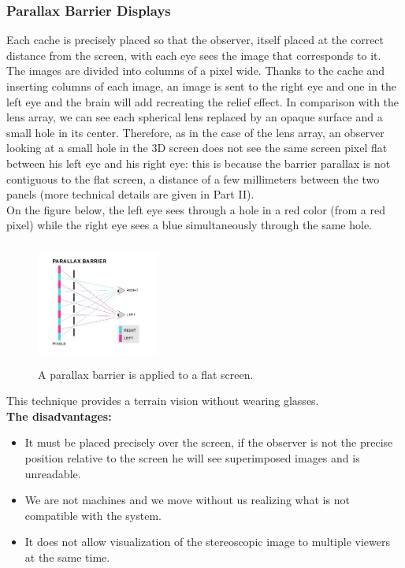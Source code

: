 \subsubsection{Parallax Barrier Displays}

Each cache is precisely placed so that the observer, itself placed at the correct distance from the screen, with each eye sees the image that corresponds to it. The images are divided into columns of a pixel wide. Thanks to the cache and inserting columns of each image, an image is sent to the right eye and one in the left eye and the brain will add recreating the relief effect.
In comparison with the lens array, we can see each spherical lens replaced by an opaque surface and a small hole in its center. Therefore, as in the case of the lens array, an observer looking at a small hole in the 3D screen does not see the same screen pixel flat between his left eye and his right eye: this is because the barrier parallax is not contiguous to the flat screen, a distance of a few millimeters between the two panels (more technical details are given in Part II).\\
On the figure below, the left eye sees through a hole in a red color (from a red pixel) while the right eye sees a blue simultaneously through the same hole.

\begin{figure}[h!]
\begin{center}
\begin{minipage}{1\linewidth}
\centering\includegraphics[width=4cm,height=4cm]{image/parallax.jpg}
\caption{A parallax barrier is applied to a flat screen.}
\end{minipage}
\end{center}
\end{figure}

This technique provides a terrain vision without wearing glasses.\\
\textbf{The disadvantages:}
\begin{itemize}

\item It must be placed precisely over the screen, if the observer is not the precise position relative to the screen he will see superimposed images and is unreadable.
\item We are not machines and we move without us realizing what is not compatible with the system.
\item It does not allow visualization of the stereoscopic image to multiple viewers at the same time.
\end{itemize}
